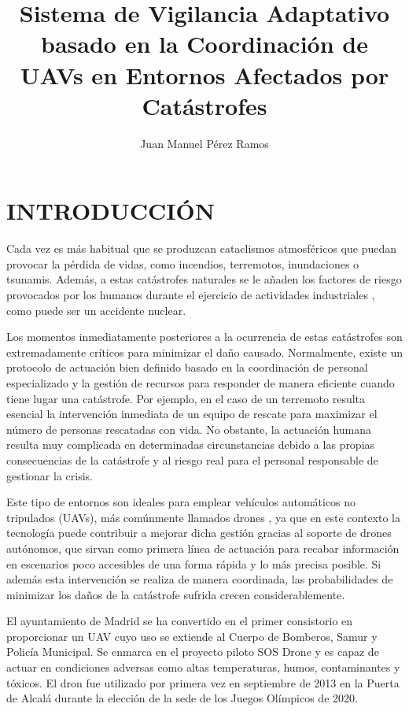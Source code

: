 \documentclass{pre-tfg}
\title{Sistema de Vigilancia Adaptativo basado en la Coordinación de UAVs en Entornos Afectados por Catástrofes}
\author{Juan Manuel Pérez Ramos}
\begin{document}
\maketitle
\tableofcontents

\newpage

\section{INTRODUCCIÓN}

Cada vez es más habitual que se produzcan cataclismos atmosféricos \cite{desastres} que puedan provocar la pérdida de vidas, como incendios, terremotos, inundaciones o tsunamis. Además, a estas catástrofes naturales se le añaden los factores de riesgo provocados por los humanos durante el ejercicio de actividades industriales \cite{desastres}, como puede ser un accidente nuclear.
  
Los momentos inmediatamente posteriores a la ocurrencia de estas catástrofes son extremadamente críticos para minimizar el daño causado. Normalmente, existe un protocolo de actuación bien definido basado en la coordinación de personal especializado y la gestión de recursos para responder de manera eficiente cuando tiene lugar una catástrofe. Por ejemplo, en el caso de un terremoto resulta esencial la intervención inmediata de un equipo de rescate para maximizar el número de personas rescatadas con vida. No obstante, la actuación humana resulta muy complicada en determinadas circunstancias debido a las propias consecuencias de la catástrofe y al riesgo real para el personal responsable de gestionar la crisis.

Este tipo de entornos son ideales para emplear vehículos automáticos no tripulados (UAVs), más comúnmente llamados drones \cite{dron1}, ya que en este contexto la tecnología puede contribuir a mejorar dicha gestión gracias al soporte de drones autónomos, que sirvan como primera línea de actuación para recabar información en escenarios poco accesibles de una forma rápida y lo más precisa posible. Si además esta intervención se realiza de manera coordinada, las probabilidades de minimizar los daños de la catástrofe sufrida crecen considerablemente.

El ayuntamiento de Madrid se ha convertido en el primer consistorio en proporcionar un UAV cuyo uso se extiende al Cuerpo de Bomberos, Samur y Policía Municipal. Se enmarca en el proyecto piloto SOS Drone \cite{sosdrone} y es capaz de actuar en condiciones adversas como altas temperaturas, humos, contaminantes y tóxicos. El dron fue utilizado por primera vez en septiembre de 2013 en la Puerta de Alcalá durante la elección de la sede de los Juegos Olímpicos de 2020.
\end{document}
